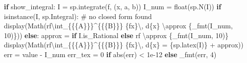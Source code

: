 \documentclass[
  letterpaper,
  DIV=11,
  numbers=noendperiod]{scrreprt}
\newenvironment{Shaded}{\begin{snugshade}}{\end{snugshade}}
\newcommand{\BuiltInTok}[1]{\textcolor[rgb]{0.00,0.23,0.31}{#1}}
\newcommand{\CharTok}[1]{\textcolor[rgb]{0.13,0.47,0.30}{#1}}
\newcommand{\CommentTok}[1]{\textcolor[rgb]{0.37,0.37,0.37}{#1}}
\newcommand{\ControlFlowTok}[1]{\textcolor[rgb]{0.00,0.23,0.31}{\textbf{#1}}}
\newcommand{\DecValTok}[1]{\textcolor[rgb]{0.68,0.00,0.00}{#1}}
\newcommand{\ErrorTok}[1]{\textcolor[rgb]{0.68,0.00,0.00}{#1}}
\newcommand{\FloatTok}[1]{\textcolor[rgb]{0.68,0.00,0.00}{#1}}
\newcommand{\NormalTok}[1]{\textcolor[rgb]{0.00,0.23,0.31}{#1}}
\newcommand{\OperatorTok}[1]{\textcolor[rgb]{0.37,0.37,0.37}{#1}}
\newcommand{\SpecialCharTok}[1]{\textcolor[rgb]{0.37,0.37,0.37}{#1}}
\newcommand{\StringTok}[1]{\textcolor[rgb]{0.13,0.47,0.30}{#1}}
\newcommand{\VerbatimStringTok}[1]{\textcolor[rgb]{0.13,0.47,0.30}{#1}}
\theoremstyle{plain}
\theoremstyle{plain}
\theoremstyle{definition}
\theoremstyle{definition}
\theoremstyle{definition}
\theoremstyle{plain}
\theoremstyle{plain}
\theoremstyle{remark}
\begin{document}
\begin{Shaded}
\begin{Highlighting}[]
    \ControlFlowTok{if}\NormalTok{ show\_integral:}
\NormalTok{        I }\OperatorTok{=}\NormalTok{ sp.integrate(f, (x, a, b))}
\NormalTok{        I\_num }\OperatorTok{=} \BuiltInTok{float}\NormalTok{(sp.N(I))}
        \ControlFlowTok{if} \BuiltInTok{isinstance}\NormalTok{(I, sp.Integral):   }\CommentTok{\# no closed form found}
\NormalTok{            display(Math(}\VerbatimStringTok{rf\textquotesingle{}}\ErrorTok{\textbackslash{}}\VerbatimStringTok{int\_}\CharTok{\{\{}\SpecialCharTok{\{}\NormalTok{A}\SpecialCharTok{\}}\CharTok{\}\}}\DecValTok{\^{}}\CharTok{\{\{}\SpecialCharTok{\{}\NormalTok{B}\SpecialCharTok{\}}\CharTok{\}\}}\VerbatimStringTok{ }\SpecialCharTok{\{}\NormalTok{fx}\SpecialCharTok{\}}\CharTok{\textbackslash{},}\VerbatimStringTok{ d}\SpecialCharTok{\{}\NormalTok{x}\SpecialCharTok{\}}\VerbatimStringTok{ }\CharTok{\textbackslash{}a}\VerbatimStringTok{pprox }\SpecialCharTok{\{}\NormalTok{\_fmt(I\_num, }\DecValTok{10}\NormalTok{)}\SpecialCharTok{\}}\VerbatimStringTok{\textquotesingle{}}\NormalTok{))}
        \ControlFlowTok{else}\NormalTok{:}
\NormalTok{            approx }\OperatorTok{=} \StringTok{\textquotesingle{}\textquotesingle{}} \ControlFlowTok{if}\NormalTok{ I.is\_Rational }\ControlFlowTok{else} \VerbatimStringTok{rf\textquotesingle{} }\CharTok{\textbackslash{}a}\VerbatimStringTok{pprox }\SpecialCharTok{\{}\NormalTok{\_fmt(I\_num, }\DecValTok{10}\NormalTok{)}\SpecialCharTok{\}}\VerbatimStringTok{\textquotesingle{}}
\NormalTok{            display(Math(}\VerbatimStringTok{rf\textquotesingle{}}\ErrorTok{\textbackslash{}}\VerbatimStringTok{int\_}\CharTok{\{\{}\SpecialCharTok{\{}\NormalTok{A}\SpecialCharTok{\}}\CharTok{\}\}}\DecValTok{\^{}}\CharTok{\{\{}\SpecialCharTok{\{}\NormalTok{B}\SpecialCharTok{\}}\CharTok{\}\}}\VerbatimStringTok{ }\SpecialCharTok{\{}\NormalTok{fx}\SpecialCharTok{\}}\CharTok{\textbackslash{},}\VerbatimStringTok{ d}\SpecialCharTok{\{}\NormalTok{x}\SpecialCharTok{\}}\VerbatimStringTok{ = }\SpecialCharTok{\{}\NormalTok{sp}\SpecialCharTok{.}\NormalTok{latex(I)}\SpecialCharTok{\}}\VerbatimStringTok{\textquotesingle{}} \OperatorTok{+}\NormalTok{ approx))}
\NormalTok{        err }\OperatorTok{=}\NormalTok{ value }\OperatorTok{{-}}\NormalTok{ I\_num}
\NormalTok{        err\_tex }\OperatorTok{=} \StringTok{\textquotesingle{}0\textquotesingle{}} \ControlFlowTok{if} \BuiltInTok{abs}\NormalTok{(err) }\OperatorTok{\textless{}} \FloatTok{1e{-}12} \ControlFlowTok{else}\NormalTok{ \_fmt(err, }\DecValTok{4}\NormalTok{)}

\end{Highlighting}
\end{Shaded}
\end{document}
